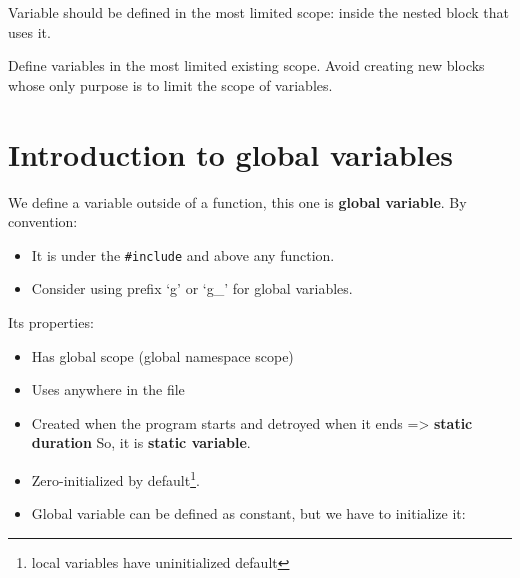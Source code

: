 \documentclass[
  letterpaper,
  DIV=11,
  numbers=noendperiod]{scrreprt}
\begin{document}
Variable should be defined in the most limited scope: inside the nested
block that uses it.

\begin{tcolorbox}[enhanced jigsaw, toprule=.15mm, rightrule=.15mm, opacityback=0, breakable, leftrule=.75mm, colback=white, colframe=quarto-callout-tip-color-frame, arc=.35mm, left=2mm, bottomrule=.15mm]
\begin{minipage}[t]{5.5mm}
\textcolor{quarto-callout-tip-color}{\faLightbulb}
\end{minipage}%
\begin{minipage}[t]{\textwidth - 5.5mm}

Define variables in the most limited existing scope. Avoid creating new
blocks whose only purpose is to limit the scope of variables.

\end{minipage}%
\end{tcolorbox}

\hypertarget{introduction-to-global-variables}{%
\section{Introduction to global
variables}\label{introduction-to-global-variables}}

We define a variable outside of a function, this one is \textbf{global
variable}. By convention:

\begin{itemize}
\item
  It is under the \texttt{\#include} and above any function.
\item
  Consider using prefix `g' or `g\_' for global variables.
\end{itemize}

Its properties:

\begin{itemize}
\item
  Has global scope (global namespace scope)
\item
  Uses anywhere in the file
\item
  Created when the program starts and detroyed when it ends
  =\textgreater{} \textbf{static duration} So, it is \textbf{static
  variable}.
\item
  Zero-initialized by default\footnote{local variables have
    uninitialized default}.
\item
  Global variable can be defined as constant, but we have to initialize
  it:
\end{itemize}
\end{document}
